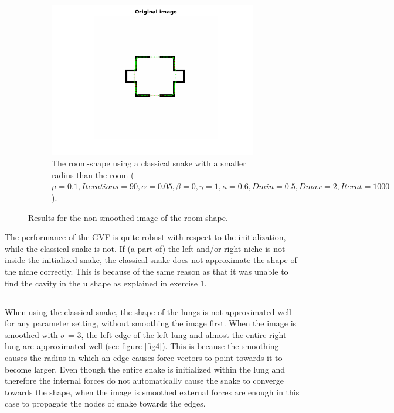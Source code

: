 \documentclass{article}
\begin{document}
\begin{figure}[H]
\begin{subfigure}{0.49\textwidth}
  \centering
  \includegraphics[width=\linewidth]{fig3c.png}
  \caption{The room-shape using a classical snake with a smaller radius than the room ($\mu=0.1, Iterations=90, \alpha=0.05, \beta=0, \gamma=1,\kappa=0.6,Dmin=0.5,Dmax=2,Iterat=1000$).}
  \label{fig3c}
\end{subfigure}
\caption{Results for the non-smoothed image of the room-shape.}
\label{fig3}
\end{figure}

The performance of the GVF is quite robust with respect to the initialization, while the classical snake is not. If (a part of) the left and/or right niche is not inside the initialized snake, the classical snake does not approximate the shape of the niche correctly. This is because of the same reason as that it was unable to find the cavity in the u shape as explained in exercise 1.

\subsection{}
When using the classical snake, the shape of the lungs is not approximated well for any parameter setting, without smoothing the image first. When the image is smoothed with $\sigma$ = 3, the left edge of the left lung and almost the entire right lung are approximated well (see figure \ref{fig4}). This is because the smoothing causes the radius in which an edge causes force vectors to point towards it to become larger. Even though the entire snake is initialized within the lung and therefore the internal forces do not automatically cause the snake to converge towards the shape, when the image is smoothed external forces are enough in this case to propagate the nodes of snake towards the edges.
\end{document}
